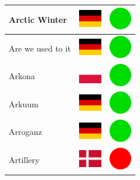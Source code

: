 \documentclass[12pt, a4paper, twoside]{report}
\begin{document}
\begin{center}
\begin{longtable}{|p{5cm}|p{2cm}|p{2cm}|}
 Arctic Winter                                              & \includegraphics[width=1cm]{../4x3/de} &   \includegraphics[width=1cm]{../likes/y} \\ \hline
 Are we used to it                                          & \includegraphics[width=1cm]{../4x3/de} &   \includegraphics[width=1cm]{../likes/y} \\ \hline
 Arkona                                                     & \includegraphics[width=1cm]{../4x3/pl} &   \includegraphics[width=1cm]{../likes/y} \\ \hline
 Arkuum                                                     & \includegraphics[width=1cm]{../4x3/de} &   \includegraphics[width=1cm]{../likes/y} \\ \hline
 Arroganz                                                   & \includegraphics[width=1cm]{../4x3/de} &   \includegraphics[width=1cm]{../likes/y} \\ \hline
 Artillery                                                  & \includegraphics[width=1cm]{../4x3/dk} &   \includegraphics[width=1cm]{../likes/n} \\ \hline

\end{longtable}
\end{center}
\end{document}
